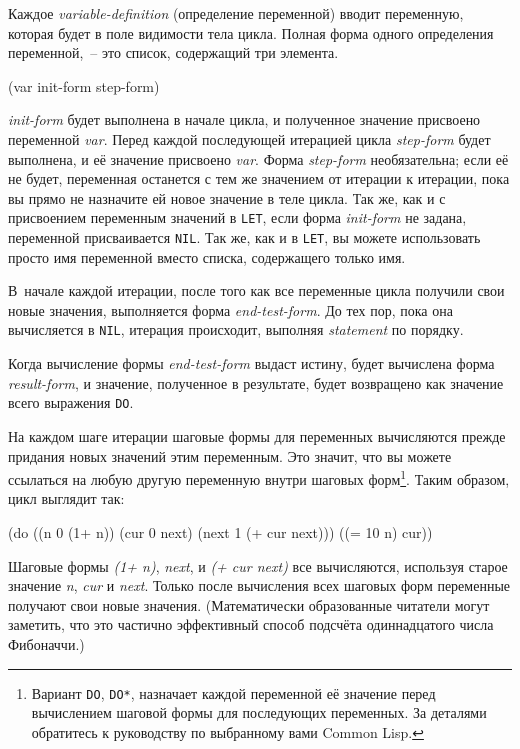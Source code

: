 Каждое \textit{variable-definition} (определение переменной) вводит переменную, которая
будет в поле видимости тела цикла. Полная форма одного определения переменной,~-- это список,
содержащий три элемента.

\begin{myverb}
(var init-form step-form)
\end{myverb}

\noindent{}\textit{init-form} будет выполнена в начале цикла, и полученное значение присвоено
переменной \textit{var}.  Перед каждой последующей итерацией цикла \textit{step-form}
будет выполнена, и её значение присвоено \textit{var}.  Форма \textit{step-form}
необязательна; если её не будет, переменная останется с тем же значением от итерации к
итерации, пока вы прямо не назначите ей новое значение в теле цикла. Так же, как и с
присвоением переменным значений в \lstinline{LET}, если форма \textit{init-form} не задана,
переменной присваивается \lstinline{NIL}. Так же, как и в \lstinline{LET}, вы можете использовать
просто имя переменной вместо списка, содержащего только имя.

В~начале каждой итерации, после того как все переменные цикла получили свои новые
значения, выполняется форма \textit{end-test-form}. До тех пор, пока она вычисляется в
\lstinline{NIL}, итерация происходит, выполняя \textit{statement} по порядку.

Когда вычисление формы \textit{end-test-form} выдаст истину, будет вычислена форма
\textit{result-form}, и значение, полученное в результате, будет возвращено как значение
всего выражения \lstinline{DO}.

На каждом шаге итерации шаговые формы для переменных вычисляются прежде придания новых
значений этим переменным. Это значит, что вы можете ссылаться на любую другую переменную
внутри шаговых форм\footnote{Вариант \lstinline{DO}, \lstinline{DO*}, назначает каждой переменной
  её значение перед вычислением шаговой формы для последующих переменных. За деталями
  обратитесь к руководству по выбранному вами Common Lisp.}. Таким образом, цикл выглядит
так:

\begin{myverb}
(do ((n 0 (1+ n))
     (cur 0 next)
     (next 1 (+ cur next)))
    ((= 10 n) cur))
\end{myverb}

Шаговые формы \textit{(1+ n)}, \textit{next}, и \textit{(+ cur next)} все вычисляются,
используя старое значение \textit{n}, \textit{cur} и \textit{next}. Только после
вычисления всех шаговых форм переменные получают свои новые значения. (Математически
образованные читатели могут заметить, что это частично эффективный способ подсчёта
одиннадцатого числа Фибоначчи.)

